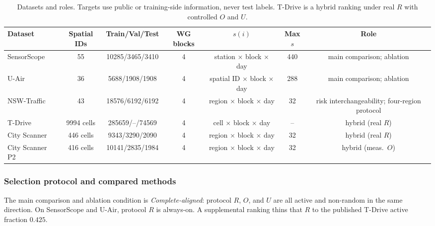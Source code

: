 \documentclass[letterpaper,journal]{IEEEtran}
\begin{document}
\begin{table}[t]
\centering
\caption{Datasets and roles.  Targets use public or training-side
information, never test labels.  T-Drive is a hybrid ranking under real
$R$ with controlled $O$ and $U$.}
\label{tab:datasets}
\scriptsize
\setlength{\tabcolsep}{3.2pt}
\begin{tabular*}{\textwidth}{@{\extracolsep{\fill}}lcccccc}
\toprule
Dataset & Spatial IDs & Train/Val/Test & WG blocks &
$s(i)$ & Max $s$ & Role\\
\midrule
SensorScope~\cite{ingelrest2010sensorscope} & 55 & 10285/3465/3410 & 4 &
station $\times$ block $\times$ day & 440 & main comparison; ablation\\
U-Air~\cite{zheng2013uair} & 36 & 5688/1908/1908 & 4 &
spatial ID $\times$ block $\times$ day & 288 & main comparison; ablation\\
NSW-Traffic~\cite{tfnsw2024traffic} & 43 & 18576/6192/6192 & 4 &
region $\times$ block $\times$ day & 32 & risk interchangeability; four-region protocol\\
T-Drive~\cite{yuan2010tdrive} & 9994 cells & 285659/--/74569 & 4 &
cell $\times$ block $\times$ day & -- & hybrid (real $R$)\\
City Scanner~\cite{wang2023cityscanner} & 446 cells & 9343/3290/2090 & 4 &
region $\times$ block $\times$ day & 32 & hybrid (real $R$)\\
City Scanner P2 & 416 cells & 10141/2835/1984 & 4 &
region $\times$ block $\times$ day & 32 & hybrid (meas.\ $O$)\\
\bottomrule
\end{tabular*}
\end{table}

\subsubsection{Selection protocol and compared methods}

The main comparison and ablation condition is \emph{Complete-aligned}: protocol $R$, $O$,
and $U$ are all active and non-random in the same direction.  On
SensorScope and U-Air, protocol $R$ is always-on.  A supplemental ranking
thins that $R$ to the published T-Drive active fraction $0.425$.
\end{document}
